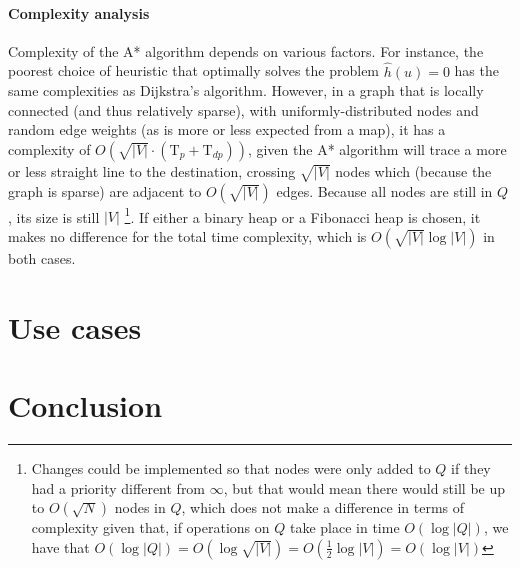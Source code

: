 \documentclass{report}[a4paper]
\theoremstyle{remark}
\begin{document}
\subsubsection{Complexity analysis}
Complexity of the A* algorithm depends on various factors. For instance, the poorest choice of heuristic that optimally solves the problem $\hat{h}(u)=0$ has the same complexities as Dijkstra's algorithm. However, in a graph that is locally connected (and thus relatively sparse), with uniformly-distributed nodes and random edge weights (as is more or less expected from a map), it has a complexity of $O(\sqrt{|V|} \cdot (\text{T}_{p}+\text{T}_{dp}))$, given the A* algorithm will trace a more or less straight line to the destination, crossing $\sqrt{|V|}$ nodes which (because the graph is sparse) are adjacent to $O(\sqrt{|V|})$ edges. Because all nodes are still in $Q$, its size is still $|V|$ \footnote{Changes could be implemented so that nodes were only added to $Q$ if they had a priority different from $\infty$, but that would mean there would still be up to $O(\sqrt{N})$ nodes in $Q$, which does not make a difference in terms of complexity given that, if operations on $Q$ take place in time $O(\log |Q|)$, we have that $O(\log |Q|)=O(\log \sqrt{|V|})=O(\frac{1}{2}\log |V|)=O(\log |V|)$}.
If either a binary heap or a Fibonacci heap is chosen, it makes no difference for the total time complexity, which is $O(\sqrt{|V|} \log |V|)$ in both cases.
\chapter{Use cases}
\chapter{Conclusion}


\end{document}
